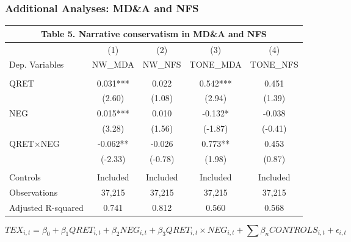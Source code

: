 \documentclass{beamer}
\begin{document}
\begin{frame}
\frametitle{Additional Analyses: MD\&A and NFS}
\begin{table}[H]	\label{T5}%
	\begin{center} \scriptsize
		\begin{tabular}{lcccc}
			\multicolumn{5}{c}{\textbf{Table 5. Narrative conservatism in MD\&A and NFS}} \\
			\midrule
			\midrule
			& (1) & (2) & (3) & (4) \\
			Dep. Variables & NW\_MDA & NW\_NFS & TONE\_MDA & TONE\_NFS \\
			\midrule
			&   &   &   &  \\
			QRET & 0.031*** & 0.022 & 0.542*** & 0.451 \\
			& (2.60) & (1.08) & (2.94) & (1.39) \\
			NEG & 0.015*** & 0.010 & -0.132* & -0.038 \\
			& (3.28) & (1.56) & (-1.87) & (-0.41) \\
			QRET$\times$NEG & -0.062** & -0.026 & 0.773** & 0.453 \\
			& (-2.33) & (-0.78) & (1.98) & (0.87) \\
			&   &   &   &  \\
			Controls & Included & Included & Included & Included \\
			Observations & 37,215 & 37,215 & 37,215 & 37,215 \\
			Adjusted R-squared & 0.741 & 0.812 & 0.560 & 0.568 \\
			\midrule
			\bottomrule
		\end{tabular}%
	\end{center}
\begin{footnotesize} \tiny
	\setcounter{equation}{0}
	\begin{equation}
	TEX_{i,t}=\beta_0+\beta_1QRET_{i,t}+\beta_2NEG_{i,t}+\beta_3QRET_{i,t}\times NEG_{i,t}+\sum\beta_nCONTROLS_{i,t}+\epsilon_{i,t}
	\end{equation}
	

\end{footnotesize}
\end{table}
\end{frame}
\end{document}
